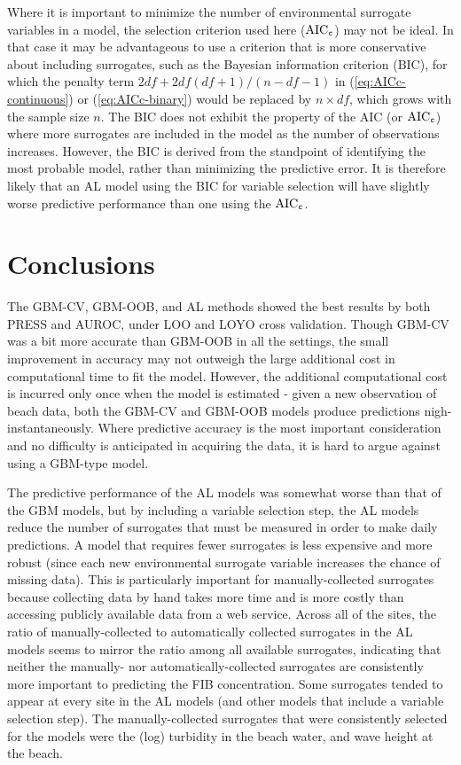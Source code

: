\documentclass[authoryear,review, 12pt]{elsarticle}
\begin{document}
Where it is important to minimize the number of environmental surrogate variables in a model, the selection
criterion used here (\(\text{AIC}_{\tt c}\)) may not be ideal. In that
case it may be advantageous to use a criterion that is more conservative
about including surrogates, such as the Bayesian
information criterion (BIC), for which the penalty term
\(2df + 2df(df+1)/(n-df-1)\) in (\ref{eq:AICc-continuous}) or
(\ref{eq:AICc-binary}) would be replaced by \(n \times df\), which grows
with the sample size \(n\). The BIC does not exhibit the property of the
AIC (or \(\text{AIC}_{\tt c}\)) where more surrogates are included in
the model as the number of observations increases. However, the BIC is
derived from the standpoint of identifying the most probable model,
rather than minimizing the predictive error. It is therefore likely that
an AL model using the BIC for variable selection will have slightly
worse predictive performance than one using the \(\text{AIC}_{\tt c}\).

\section{Conclusions}\label{discussion}

The GBM-CV, GBM-OOB, and AL methods showed the best results by both
PRESS and AUROC, under LOO and LOYO cross validation. Though GBM-CV was
a bit more accurate than GBM-OOB in all the settings, the small
improvement in accuracy may not outweigh the large additional cost in
computational time to fit the model. However, the additional
computational cost is incurred only once when the model is estimated -
given a new observation of beach data, both the GBM-CV and GBM-OOB
models produce predictions nigh-instantaneously. Where predictive
accuracy is the most important consideration and no difficulty is
anticipated in acquiring the data, it is hard to argue against using a
GBM-type model.

The predictive performance of the AL models was somewhat worse than that
of the GBM models, but by including a variable selection step, the AL
models reduce the number of surrogates that must be measured in order to
make daily predictions. A model that requires fewer surrogates is less
expensive and more robust (since each new environmental surrogate variable increases the chance of missing data). This is
particularly important for manually-collected surrogates because
collecting data by hand takes more time and is more costly than
accessing publicly available data from a web service. Across all of
the sites, the ratio of manually-collected to automatically collected
surrogates in the AL models seems to mirror the ratio among all
available surrogates, indicating that neither the manually- nor
automatically-collected surrogates are consistently more important to
predicting the FIB concentration. Some surrogates tended to appear
at every site in the AL models (and other models that include a
variable selection step). The manually-collected surrogates that were
consistently selected for the models were the (log) turbidity in the
beach water, and wave height at the beach.
\end{document}
